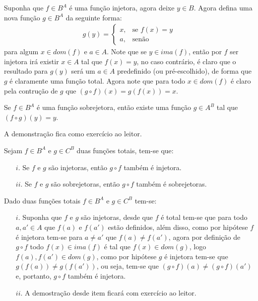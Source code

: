 \begin{prova}
	Suponha que $f \in B^A$ é uma função injetora, agora deixe $y \in B$. Agora defina uma nova função $g \in B^A$ da seguinte forma:
	\begin{eqnarray*}
		g(y) = \left\{\begin{array}{ll}
			x, & \text{se } f(x) = y\\
			a, & \text{senão}
		\end{array}\right.
	\end{eqnarray*}
	para algum $x \in dom(f)$ e $a \in A$. Note que se $y \in ima(f)$, então por $f$ ser injetora irá existir $x \in A$ tal que $f(x) = y$, no caso contrário, é claro que o resultado para $g(y)$ será um $a \in A$ predefinido (ou pré-escolhido), de forma que $g$ é claramente uma função total. Agora note que para todo $x \in dom(f)$ é claro pela contrução de $g$ que $(g \circ f)(x) = g(f(x)) = x$.
\end{prova}

\begin{teorema}\label{teo:InversaDireta}
	Se $f \in B^A$ é uma função sobrejetora, então existe uma função $g \in A^B$ tal que $(f \circ g)(y) = y$.
\end{teorema}

\begin{prova}
	A demonstração fica como exercício ao leitor.
\end{prova}

\begin{teorema}\label{teo:ComposicaoFuncaoPreservaTipo}
	Sejam $f \in B^A$ e $g \in C^B$ duas funções totais, tem-se que:
	\begin{itemize}
		\item[$i$.] Se $f$ e $g$ são injetoras, então $g \circ f$ também é injetora.
		\item[$ii$.] Se $f$ e $g$ são sobrejetoras, então $g \circ f$ também é sobrejetoras.
	\end{itemize}
\end{teorema}

\begin{prova}
	Dado duas funções totais $f \in B^A$ e $g \in C^B$ tem-se:
	\begin{itemize}
		\item[$i$.] Suponha que $f$ e $g$ são injetoras, desde que $f$ é total tem-se que para todo $a, a' \in A$ que $f(a)$ e $f(a')$ estão definidos, além disso, como por hipótese $f$ é injetora tem-se para $a \neq a'$ que $f(a) \neq f(a')$, agora por definição de $g \circ f$ todo $f(x) \in ima(f)$ é tal que $f(x) \in dom(g)$, logo $f(a), f(a') \in dom(g)$, como por hipótese $g$ é injetora tem-se que $g(f(a)) \neq g(f(a'))$, ou seja, tem-se que $(g \circ f)(a) \neq (g \circ f)(a')$ e, portanto, $g \circ f$ também é injetora.
		\item[$ii$.] A demostração desde item ficará com exercício ao leitor.
	\end{itemize}
\end{prova}

